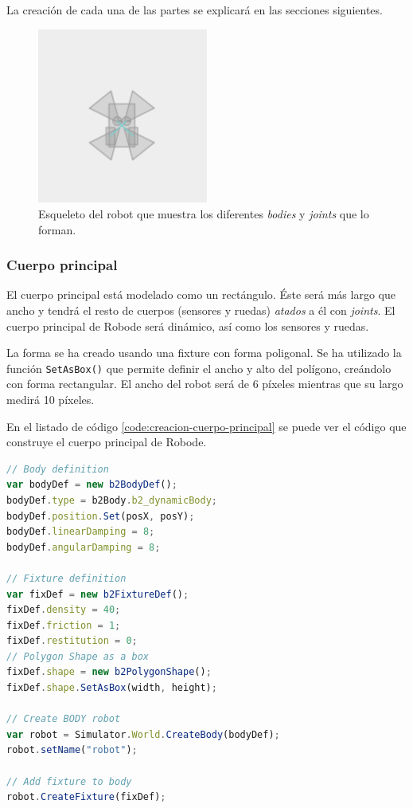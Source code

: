 La creación de cada una de las partes se explicará en las secciones siguientes.

\begin{figure}[!ht]
	\begin{centering}
		\includegraphics[width=0.5\textwidth]{images/robot-skel.png}
			\caption{Esqueleto del robot que muestra los diferentes \emph{bodies} y \emph{joints} que lo forman.}
				\label{fig:robot-skel}
	\end{centering}
\end{figure}


\subsubsection*{Cuerpo principal}
\label{sec:cuerpo-principal}

El cuerpo principal está modelado como un rectángulo. Éste será más largo que ancho y tendrá el resto de cuerpos (sensores y ruedas) \emph{atados} a él con \emph{joints}. El cuerpo principal de Robode será dinámico, así como los sensores y ruedas.

La forma se ha creado usando una fixture con forma poligonal. Se ha utilizado la función \texttt{SetAsBox()} que permite definir el ancho y alto del polígono, creándolo con forma rectangular. El ancho del robot será de 6 píxeles mientras que su largo medirá 10 píxeles.

En el listado de código \ref{code:creacion-cuerpo-principal} se puede ver el código que construye el cuerpo principal de Robode.

\begin{lstlisting}[language={Javascript},label={code:creacion-cuerpo-principal}, caption={Creación del cuerpo principal del robot utilizando la librería Box2dweb.}]
// Body definition
var bodyDef = new b2BodyDef(); 
bodyDef.type = b2Body.b2_dynamicBody;
bodyDef.position.Set(posX, posY);
bodyDef.linearDamping = 8;
bodyDef.angularDamping = 8;

// Fixture definition
var fixDef = new b2FixtureDef(); 
fixDef.density = 40;
fixDef.friction = 1;
fixDef.restitution = 0;
// Polygon Shape as a box
fixDef.shape = new b2PolygonShape(); 
fixDef.shape.SetAsBox(width, height);

// Create BODY robot
var robot = Simulator.World.CreateBody(bodyDef);
robot.setName("robot");

// Add fixture to body
robot.CreateFixture(fixDef);
\end{lstlisting}



